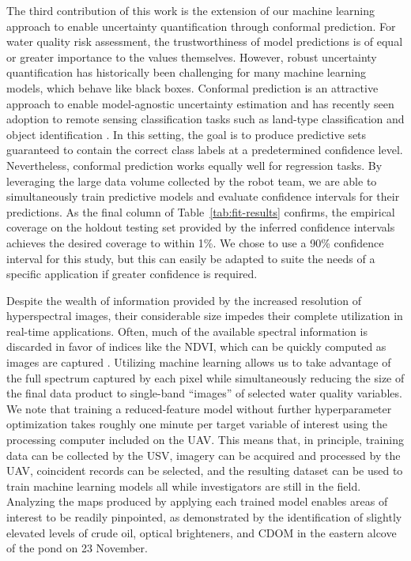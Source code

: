 The third contribution of this work is the extension of our machine learning approach to enable uncertainty quantification through conformal prediction. For water quality risk assessment, the trustworthiness of model predictions is of equal or greater importance to the values themselves. However, robust uncertainty quantification has historically been challenging for many machine learning models, which behave like black boxes.
Conformal prediction is an attractive approach to enable model-agnostic uncertainty estimation and has recently seen adoption to remote sensing classification tasks such as land-type classification and object identification \cite{valle2023quantifying, zhu2024inductive}. In this setting, the goal is to produce predictive sets guaranteed to contain the correct class labels at a predetermined confidence level. Nevertheless, conformal prediction works equally well for regression tasks. By leveraging the large data volume collected by the robot team, we are able to simultaneously train predictive models and evaluate confidence intervals for their predictions. As the final column of Table~\ref{tab:fit-results} confirms, the empirical coverage on the holdout testing set provided by the inferred confidence intervals achieves the desired coverage to within 1\%. We chose to use a 90\% confidence interval for this study, but this can easily be adapted to suite the needs of a specific application if greater confidence is required. 

Despite the wealth of information provided by the increased resolution of hyperspectral images, their considerable size impedes their complete utilization in real-time applications. Often, much of the available spectral information is discarded in favor of indices like the NDVI, which can be quickly computed as images are captured \cite{horstrand2019uav}. Utilizing machine learning allows us to take advantage of the full spectrum captured by each pixel while simultaneously reducing the size of the final data product to single-band ``images'' of selected water quality variables. We note that training a reduced-feature model without further hyperparameter optimization takes roughly one minute per target variable of interest using the processing computer included on the UAV. This means that, in principle, training data can be collected by the USV, imagery can be acquired and processed by the UAV, coincident records can be selected, and the resulting dataset can be used to train machine learning models all while investigators are still in the field. Analyzing the maps produced by applying each trained model enables areas of interest to be readily pinpointed, as demonstrated by the identification of slightly elevated levels of %
crude oil, optical brighteners, and CDOM in the eastern alcove of the pond on 23 November.

